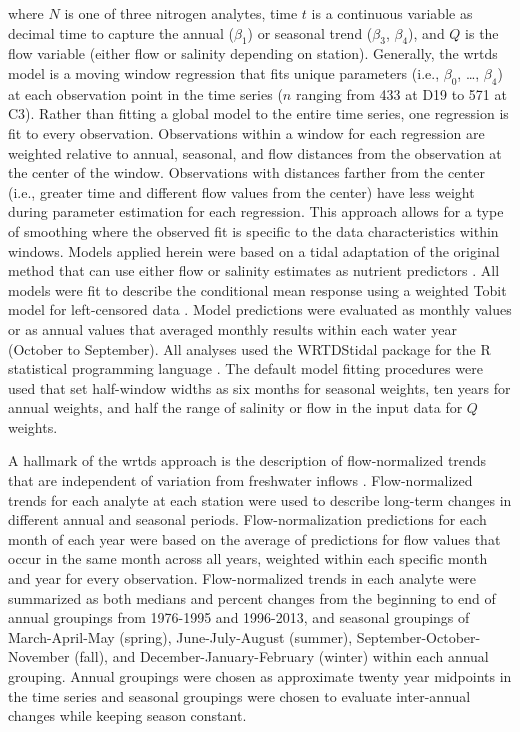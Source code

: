 \documentclass[letterpaper,12pt,oneside]{article}\usepackage[]{graphicx}\usepackage[]{color}
\begin{document}
\noindent where $N$ is one of three nitrogen analytes, time $t$ is a continuous variable as decimal time to capture the annual ($\beta_1$) or seasonal trend ($\beta_3$, $\beta_4$), and $Q$ is the flow variable (either flow or salinity depending on station).  Generally, the \ac{wrtds} model is a moving window regression that fits unique parameters (i.e., $\beta_0$, \ldots, $\beta_4$) at each observation point in the time series ($n$ ranging from 433 at D19 to 571 at C3).  Rather than fitting a global model to the entire time series, one regression is fit to every observation.  Observations within a window for each regression are weighted relative to annual, seasonal, and flow distances from the observation at the center of the window.  Observations with distances farther from the center (i.e., greater time and different flow values from the center) have less weight during parameter estimation for each regression.  This approach allows for a type of smoothing where the observed fit is specific to the data characteristics within windows. Models applied herein were based on a tidal adaptation of the original method that can use either flow or salinity estimates as nutrient predictors \citep{Beck15}.  All models were fit to describe the conditional mean response using a weighted Tobit model for left-censored data \citep{Tobin58}.  Model predictions were evaluated as monthly values or as annual values that averaged monthly results within each water year (October to September). All analyses used the WRTDStidal package for the R statistical programming language \citep{Beck17b,RDCT17}.  The default model fitting procedures were used that set half-window widths as six months for seasonal weights, ten years for annual weights, and half the range of salinity or flow in the input data for $Q$ weights.

A hallmark of the \ac{wrtds} approach is the description of flow-normalized trends that are independent of variation from freshwater inflows \citep{Hirsch10}. Flow-normalized trends for each analyte at each station were used to describe long-term changes in different annual and seasonal periods. Flow-normalization predictions for each month of each year were based on the average of predictions for flow values that occur in the same month across all years, weighted within each specific month and year for every observation. Flow-normalized trends in each analyte were summarized as both medians and percent changes from the beginning to end of annual groupings from 1976-1995 and 1996-2013, and seasonal groupings of March-April-May (spring), June-July-August (summer), September-October-November (fall), and December-January-February (winter) within each annual grouping. Annual groupings were chosen as approximate twenty year midpoints in the time series and seasonal groupings were chosen to evaluate inter-annual changes while keeping season constant. 
\end{document}
